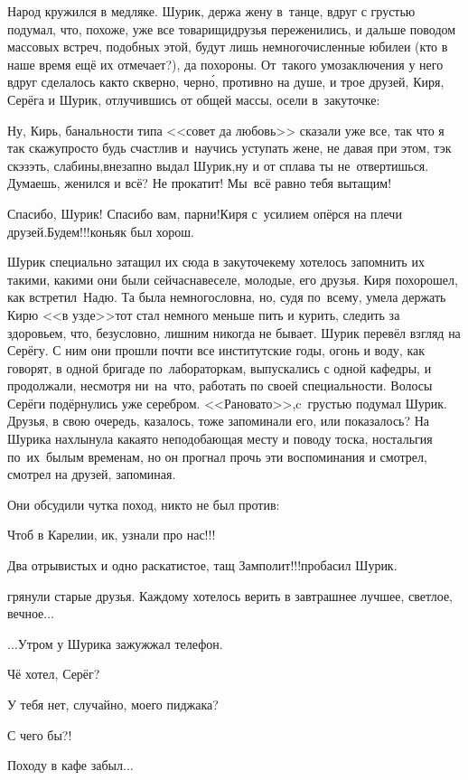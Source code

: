 {%
Народ кружился в медляке. Шурик, держа жену в~танце, вдруг с грустью подумал, что, похоже, уже все товарищи\sdash друзья переженились, и дальше поводом массовых встреч, подобных этой, будут лишь немногочисленные юбилеи (кто в наше время ещё их отмечает?), да похороны. От~такого умозаключения у него вдруг сделалось как\sdash то скверно, черн\'{о}, противно на душе, и трое друзей, Киря, Серёга и Шурик, отлучившись от общей массы, осели в~закуточке:

\diagdash Ну, Кирь, банальности типа <<совет да любовь>> сказали уже все, так что я так скажу\mdash просто будь счастлив и~научись уступать жене, не давая при этом, тэк скэзэть, слабины,\mdash внезапно выдал Шурик,\mdash ну и от сплава ты не~отвертишься. Думаешь, женился и всё? Не прокатит! Мы~всё равно тебя вытащим!

\diagdash Спасибо, Шурик! Спасибо вам, парни!\mdash Киря с~усилием опёрся на плечи друзей.\mdash Будем!!!\mdash коньяк был хорош.

Шурик специально затащил их сюда в закуточек\mdash ему хотелось запомнить их такими, какими они были сейчас\mdash навеселе, молодые, его друзья. Киря похорошел, как встретил~Надю. Та была немногословна, но, судя по~всему, умела держать Кирю <<в узде>>\mdash тот стал немного меньше пить и курить, следить за здоровьем, что, безусловно, лишним никогда не бывает. Шурик перевёл взгляд на Серёгу. С ним они прошли почти все институтские годы, огонь и воду, как говорят, в одной бригаде по~лабораторкам, выпускались с одной кафедры, и продолжали, несмотря ни~на~что, работать по своей специальности. Волосы Серёги подёрнулись уже серебром. <<Рановато>>,\mdash c~грустью подумал Шурик. Друзья, в свою очередь, казалось, тоже запоминали его, или показалось? На Шурика нахлынула какая\sdash то неподобающая месту и поводу тоска, ностальгия по~их~былым временам, но он прогнал прочь эти воспоминания и смотрел, смотрел на друзей, запоминая.  

Они обсудили чутка поход, никто не был против:

\diagdash Чтоб в Карелии, ик, узнали про нас!!!%

\diagdash Два отрывистых и одно раскатистое, тащ Замполит!!!\mdash пробасил Шурик.

\mdash грянули старые друзья. Каждому хотелось верить в завтрашнее лучшее, светлое, вечное$\ldots$

\vspace{2.0cm}

$\ldots$Утром у Шурика зажужжал телефон. 

\diagdash Чё хотел, Серёг?

\diagdash У тебя нет, случайно, моего пиджака?

\diagdash С чего бы?!

\diagdash Походу в кафе забыл$\ldots$

\begin{center}
\end{center}
}